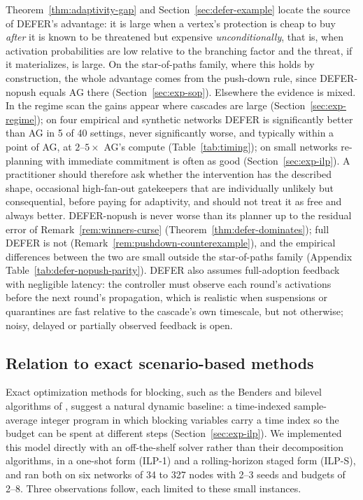 \documentclass[preprint,11pt]{elsarticle}
\theoremstyle{definition}
\theoremstyle{remark}
\begin{document}
Theorem~\ref{thm:adaptivity-gap} and Section~\ref{sec:defer-example} locate the source of DEFER's advantage: it is large when a vertex's protection is cheap to buy \emph{after} it is known to be threatened but expensive \emph{unconditionally}, that is, when activation probabilities are low relative to the branching factor and the threat, if it materializes, is large. On the star-of-paths family, where this holds by construction, the whole advantage comes from the push-down rule, since DEFER-nopush equals AG there (Section~\ref{sec:exp-sop}). Elsewhere the evidence is mixed. In the regime scan the gains appear where cascades are large (Section~\ref{sec:exp-regime}); on four empirical and synthetic networks DEFER is significantly better than AG in 5 of 40 settings, never significantly worse, and typically within a point of AG, at $2$--$5\times$ AG's compute (Table~\ref{tab:timing}); on small networks re-planning with immediate commitment is often as good (Section~\ref{sec:exp-ilp}). A practitioner should therefore ask whether the intervention has the described shape, occasional high-fan-out gatekeepers that are individually unlikely but consequential, before paying for adaptivity, and should not treat it as free and always better. DEFER-nopush is never worse than its planner up to the residual error of Remark~\ref{rem:winners-curse} (Theorem~\ref{thm:defer-dominates}); full DEFER is not (Remark~\ref{rem:pushdown-counterexample}), and the empirical differences between the two are small outside the star-of-paths family (Appendix Table~\ref{tab:defer-nopush-parity}). DEFER also assumes full-adoption feedback with negligible latency: the controller must observe each round's activations before the next round's propagation, which is realistic when suspensions or quarantines are fast relative to the cascade's own timescale, but not otherwise; noisy, delayed or partially observed feedback is open.

\subsection{Relation to exact scenario-based methods}\label{sec:discussion-exact}

Exact optimization methods for blocking, such as the Benders and bilevel
algorithms of \citet{taninmis2022,taninmis2024}, suggest a natural dynamic
baseline: a time-indexed sample-average integer program in which blocking
variables carry a time index so the budget can be spent at different steps
(Section~\ref{sec:exp-ilp}). We implemented this model directly with an
off-the-shelf solver rather than their decomposition algorithms, in a one-shot
form (ILP-1) and a rolling-horizon staged form (ILP-S),
and ran both on six networks of 34 to 327 nodes with 2--3 seeds and budgets of
2--8. Three observations follow, each limited to these small instances.
\end{document}
